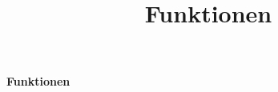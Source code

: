 \documentclass[12pt,a4paper,twoside]{article}
\title{Funktionen}
\date{}
\begin{document}
\begin{center}\textbf{\huge \textsf{Funktionen}} \end{center}

\newpage

% 
% 
% 
%  
\end{document}
